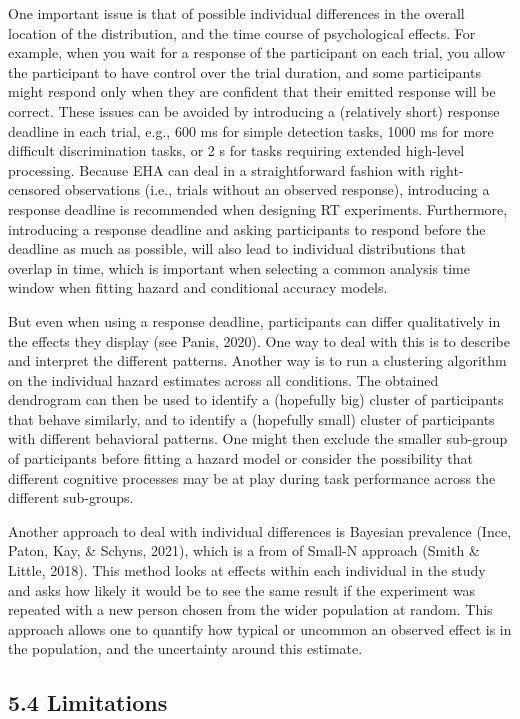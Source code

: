 \documentclass[
  man, donotrepeattitle,floatsintext]{apa6}
\begin{document}
One important issue is that of possible individual differences in the overall location of the distribution, and the time course of psychological effects. For example, when you wait for a response of the participant on each trial, you allow the participant to have control over the trial duration, and some participants might respond only when they are confident that their emitted response will be correct. These issues can be avoided by introducing a (relatively short) response deadline in each trial, e.g., 600 ms for simple detection tasks, 1000 ms for more difficult discrimination tasks, or 2 s for tasks requiring extended high-level processing. Because EHA can deal in a straightforward fashion with right-censored observations (i.e., trials without an observed response), introducing a response deadline is recommended when designing RT experiments. Furthermore, introducing a response deadline and asking participants to respond before the deadline as much as possible, will also lead to individual distributions that overlap in time, which is important when selecting a common analysis time window when fitting hazard and conditional accuracy models.

But even when using a response deadline, participants can differ qualitatively in the effects they display (see Panis, 2020). One way to deal with this is to describe and interpret the different patterns. Another way is to run a clustering algorithm on the individual hazard estimates across all conditions. The obtained dendrogram can then be used to identify a (hopefully big) cluster of participants that behave similarly, and to identify a (hopefully small) cluster of participants with different behavioral patterns. One might then exclude the smaller sub-group of participants before fitting a hazard model or consider the possibility that different cognitive processes may be at play during task performance across the different sub-groups.

Another approach to deal with individual differences is Bayesian prevalence (Ince, Paton, Kay, \& Schyns, 2021), which is a from of Small-N approach (Smith \& Little, 2018). This method looks at effects within each individual in the study and asks how likely it would be to see the same result if the experiment was repeated with a new person chosen from the wider population at random. This approach allows one to quantify how typical or uncommon an observed effect is in the population, and the uncertainty around this estimate.

\subsection{5.4 Limitations}\label{limitations}
\end{document}
